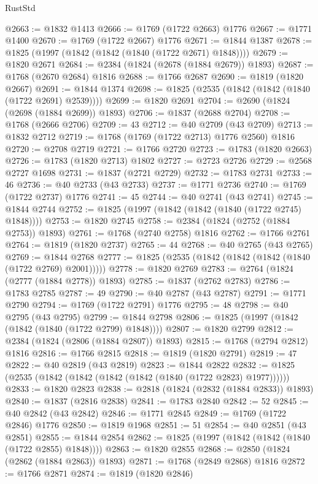 \begin{lexlean}{RustStd}
\begin{coremodule}
@2663 := @1832 @1413
@2666 := @1769 (@1722 @2663) @1776
@2667 := @1771 @1400
@2670 := @1769 (@1722 @2667) @1776
@2671 := @1844 @1387
@2678 := @1825 (@1997 (@1842 (@1842 (@1840 (@1722 @2671) @1848))))
@2679 := @1820 @2671
@2684 := @2384 (@1824 (@2678 (@1884 @2679)) @1893)
@2687 := @1768 (@2670 @2684) @1816
@2688 := @1766 @2687
@2690 := @1819 (@1820 @2667)
@2691 := @1844 @1374
@2698 := @1825 (@2535 (@1842 (@1842 (@1840 (@1722 @2691) @2539))))
@2699 := @1820 @2691
@2704 := @2690 (@1824 (@2698 (@1884 @2699)) @1893)
@2706 := @1837 (@2688 @2704)
@2708 := @1768 (@2666 @2706)
@2709 := 43
@2712 := @40 @2709 (@43 @2709)
@2713 := @1832 @2712
@2719 := @1768 (@1769 (@1722 @2713) @1776 @2560) @1816
@2720 := @2708 @2719
@2721 := @1766 @2720
@2723 := @1783 (@1820 @2663)
@2726 := @1783 (@1820 @2713) @1802
@2727 := @2723 @2726
@2729 := @2568 @2727 @1698
@2731 := @1837 (@2721 @2729)
@2732 := @1783 @2731
@2733 := 46
@2736 := @40 @2733 (@43 @2733)
@2737 := @1771 @2736
@2740 := @1769 (@1722 @2737) @1776
@2741 := 45
@2744 := @40 @2741 (@43 @2741)
@2745 := @1844 @2744
@2752 := @1825 (@1997 (@1842 (@1842 (@1840 (@1722 @2745) @1848))))
@2753 := @1820 @2745
@2758 := @2384 (@1824 (@2752 (@1884 @2753)) @1893)
@2761 := @1768 (@2740 @2758) @1816
@2762 := @1766 @2761
@2764 := @1819 (@1820 @2737)
@2765 := 44
@2768 := @40 @2765 (@43 @2765)
@2769 := @1844 @2768
@2777 := @1825 (@2535 (@1842 (@1842 (@1842 (@1840 (@1722 @2769) @2001)))))
@2778 := @1820 @2769
@2783 := @2764 (@1824 (@2777 (@1884 @2778)) @1893)
@2785 := @1837 (@2762 @2783)
@2786 := @1783 @2785
@2787 := 49
@2790 := @40 @2787 (@43 @2787)
@2791 := @1771 @2790
@2794 := @1769 (@1722 @2791) @1776
@2795 := 48
@2798 := @40 @2795 (@43 @2795)
@2799 := @1844 @2798
@2806 := @1825 (@1997 (@1842 (@1842 (@1840 (@1722 @2799) @1848))))
@2807 := @1820 @2799
@2812 := @2384 (@1824 (@2806 (@1884 @2807)) @1893)
@2815 := @1768 (@2794 @2812) @1816
@2816 := @1766 @2815
@2818 := @1819 (@1820 @2791)
@2819 := 47
@2822 := @40 @2819 (@43 @2819)
@2823 := @1844 @2822
@2832 := @1825 (@2535 (@1842 (@1842 (@1842 (@1842 (@1840 (@1722 @2823) @1977))))))
@2833 := @1820 @2823
@2838 := @2818 (@1824 (@2832 (@1884 @2833)) @1893)
@2840 := @1837 (@2816 @2838)
@2841 := @1783 @2840
@2842 := 52
@2845 := @40 @2842 (@43 @2842)
@2846 := @1771 @2845
@2849 := @1769 (@1722 @2846) @1776
@2850 := @1819 @1968
@2851 := 51
@2854 := @40 @2851 (@43 @2851)
@2855 := @1844 @2854
@2862 := @1825 (@1997 (@1842 (@1842 (@1840 (@1722 @2855) @1848))))
@2863 := @1820 @2855
@2868 := @2850 (@1824 (@2862 (@1884 @2863)) @1893)
@2871 := @1768 (@2849 @2868) @1816
@2872 := @1766 @2871
@2874 := @1819 (@1820 @2846)

\end{coremodule}
\end{lexlean}
